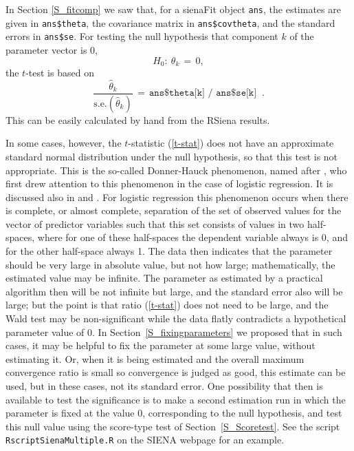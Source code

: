\documentclass[a4paper,fleqn,11pt]{article}
\newcommand{\+}{\, + \,}
\newcommand{\se}{\mbox{s.e.}}
\newcommand{\RS}{{\sf RSiena }}
\newcommand{\SI}{{\sf SIENA }}
\begin{document}
In Section \ref{S_fitcomp} we saw that, for a \textsf{sienaFit}
object \texttt{ans}, the estimates are given in
\texttt{ans\$theta}, the covariance matrix in \texttt{ans\$covtheta},
and the standard errors in \texttt{ans\$se}.
For testing the null hypothesis that component $k$ of the parameter
vector is 0,
\[
H_0 : \ \theta_k \,=\, 0 ,
\]
the $t$-test is based on
\begin{equation}
\frac{\hat\theta_k}{\se(\hat\theta_k)} \,=\,
   \texttt{ans\$theta[k] / ans\$se[k] } \ .  \label{t-stat}
\end{equation}
This can be easily calculated by hand from the \RS results.
\medskip

In some cases, however, the $t$-statistic (\ref{t-stat}) does not have
an approximate standard normal distribution under the null hypothesis,
so that this test is not appropriate.
This is the so-called Donner-Hauck phenomenon, named after
\citet{HauckDonner77}, who first drew attention to this phenomenon
in the case of logistic regression. It is discussed also in
\citet[section 1.6]{GeyerThompson92} and \citet{AlbertAnderson84}.
For logistic regression this phenomenon occurs when there is complete,
or almost complete, separation of the set of observed values
for the vector of predictor variables such that this set
consists of values in two half-spaces,
where for one of these half-spaces the
dependent variable always is 0, and for the other half-space always 1.
The data then indicates that the parameter
should be very large in absolute value, but not how large;
mathematically, the estimated value may be infinite.
The parameter as estimated by a practical algorithm
then will be not infinite but large, and the standard error
also will be large;
but the point is that ratio (\ref{t-stat}) does not need to be large,
and the Wald test may be non-significant while
the data flatly contradicts a hypothetical parameter value of 0.
In Section~\ref{S_fixingparameters} we proposed that in such cases,
it may be helpful to fix the parameter at some large value,
without estimating it.
Or, when it is being estimated and the
overall maximum convergence ratio is
small so convergence is judged as good, this estimate can be used,
but in these cases, not its standard error.
One possibility that then is available to test the significance
is to make a second estimation run in which the parameter is fixed at
the value 0, corresponding to the null hypothesis, and test
this null value using the score-type test of Section~\ref{S_Scoretest}.
See the script \texttt{RscriptSienaMultiple.R} on the \SI webpage
for an example.
\end{document}
